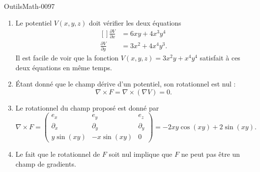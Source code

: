 
\begin{corrige}{OutilsMath-0097}

    \begin{enumerate}
        \item
            Le potentiel $V(x,y,z)$ doit vérifier les deux équations
            \begin{equation}
                \begin{aligned}[]
                    \frac{ \partial V }{ \partial x }&=6xy+4x^3y^4\\
                    \frac{ \partial V }{ \partial y }&=3x^2+4x^4y^3.
                \end{aligned}
            \end{equation}
            Il est facile de voir que la fonction $V(x,y,z)=3x^2y+x^4y^4$ satisfait à ces deux équations en même temps.
        \item
            Étant donné que le champ dérive d'un potentiel, son rotationnel est nul :
            \begin{equation}
                \nabla\times F=\nabla\times(\nabla V)=0.
            \end{equation}
        \item
            Le rotationnel du champ proposé est donné par
            \begin{equation}
                \nabla\times F=\begin{pmatrix}
                    e_x    &   e_y    &   e_z    \\
                    \partial_x    &   \partial_y    &   \partial_y    \\
                    y\sin(xy)    &   -x\sin(xy)    &   0
                \end{pmatrix}=-2xy\cos(xy)+2\sin(xy).
            \end{equation}
        \item
            Le fait que le rotationnel de $F$ soit nul implique que $F$ ne peut pas être un champ de gradients.
    \end{enumerate}

\end{corrige}
